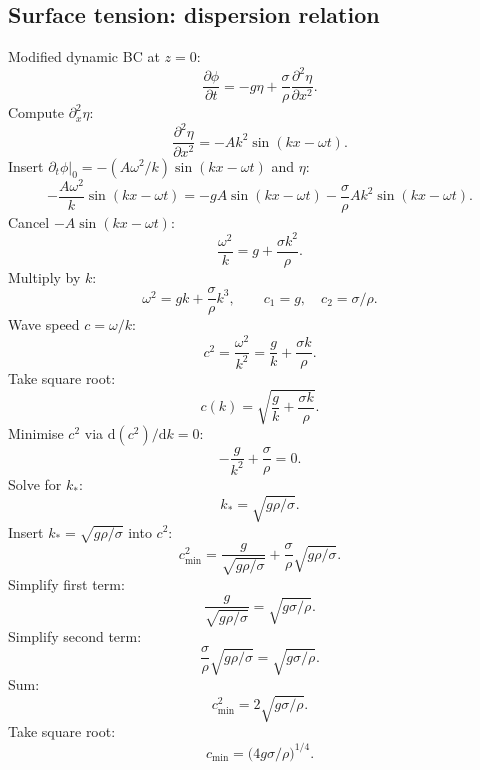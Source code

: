 \documentclass[11pt]{article}
\newcommand{\de}{\mathrm{d}}
\newcommand{\pd}[2]{\frac{\partial #1}{\partial #2}}
\newcommand{\pdd}[2]{\frac{\partial^{2} #1}{\partial #2^{2}}}
\begin{document}
\begin{center}
\end{center}

\subsection*{Surface tension: dispersion relation}

Modified dynamic BC at $z=0$:
\[ \pd{\phi}{t}=-g\eta+\frac{\sigma}{\rho}\pdd{\eta}{x}. \]
Compute $\partial_x^{2}\eta$:
\[ \pdd{\eta}{x}=-Ak^{2}\sin(kx-\omega t). \]
Insert $\partial_t\phi|_0=-(A\omega^{2}/k)\sin(kx-\omega t)$ and $\eta$:
\[ -\frac{A\omega^{2}}{k}\sin(kx-\omega t)=-gA\sin(kx-\omega t)-\frac{\sigma}{\rho}Ak^{2}\sin(kx-\omega t). \]
Cancel $-A\sin(kx-\omega t)$:
\[ \frac{\omega^{2}}{k}=g+\frac{\sigma k^{2}}{\rho}. \]
Multiply by $k$:
\begin{equation}
\boxed{\;\omega^{2}=gk+\frac{\sigma}{\rho}k^{3},\qquad c_{1}=g,\quad c_{2}=\sigma/\rho.\;}
\label{eq:disp-cap}
\end{equation}
Wave speed $c=\omega/k$:
\[ c^{2}=\frac{\omega^{2}}{k^{2}}=\frac{g}{k}+\frac{\sigma k}{\rho}. \]
Take square root:
\[ c(k)=\sqrt{\frac{g}{k}+\frac{\sigma k}{\rho}}. \]
Minimise $c^{2}$ via $\de(c^{2})/\de k=0$:
\[ -\frac{g}{k^{2}}+\frac{\sigma}{\rho}=0. \]
Solve for $k_{*}$:
\[ k_{*}=\sqrt{g\rho/\sigma}. \]
Insert $k_{*}=\sqrt{g\rho/\sigma}$ into $c^{2}$:
\[ c_{\min}^{2}=\frac{g}{\sqrt{g\rho/\sigma}}+\frac{\sigma}{\rho}\sqrt{g\rho/\sigma}. \]
Simplify first term:
\[ \frac{g}{\sqrt{g\rho/\sigma}}=\sqrt{g\sigma/\rho}. \]
Simplify second term:
\[ \frac{\sigma}{\rho}\sqrt{g\rho/\sigma}=\sqrt{g\sigma/\rho}. \]
Sum:
\[ c_{\min}^{2}=2\sqrt{g\sigma/\rho}. \]
Take square root:
\[ c_{\min}=\bigl(4g\sigma/\rho\bigr)^{1/4}. \]
\end{document}
